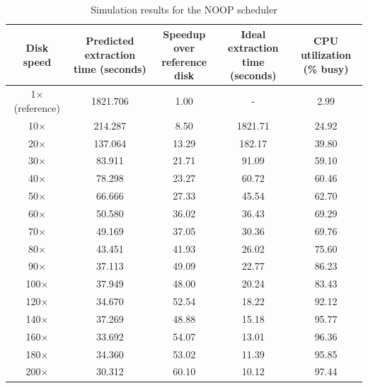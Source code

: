 \begin{table}[htbp]%
	\small
	\centering
	\caption{Simulation results for the NOOP scheduler}\label{tab:ch5-NOOP-scheduler}
	\noindent\begin{tabular}{cSSSS}
		\toprule
		\parbox{2cm}{\centering Disk speed} & \parbox{3.5cm}{\centering Predicted extraction \\ time (seconds)} & \parbox{2.5cm}{\centering Speedup over \\ reference disk} & \parbox{3cm}{\centering Ideal extraction \\ time (seconds)} & \parbox{2.5cm}{\centering CPU utilization \\ (\% busy)} \\
		\midrule
		
		1$\times$ (reference) & 1821.706 & 1.00 &  & 2.99 \\
		10$\times$ & 214.287 & 8.50 & 1821.71 & 24.92 \\
		20$\times$ & 137.064 & 13.29 & 182.17 & 39.80 \\
		30$\times$ & 83.911 & 21.71 & 91.09 & 59.10 \\
		40$\times$ & 78.298 & 23.27 & 60.72 & 60.46 \\
		50$\times$ & 66.666 & 27.33 & 45.54 & 62.70 \\
		60$\times$ & 50.580 & 36.02 & 36.43 & 69.29 \\
		70$\times$ & 49.169 & 37.05 & 30.36 & 69.76 \\
		80$\times$ & 43.451 & 41.93 & 26.02 & 75.60 \\
		90$\times$ & 37.113 & 49.09 & 22.77 & 86.23 \\
		100$\times$ & 37.949 & 48.00 & 20.24 & 83.43 \\
		120$\times$ & 34.670 & 52.54 & 18.22 & 92.12 \\
		140$\times$ & 37.269 & 48.88 & 15.18 & 95.77 \\
		160$\times$ & 33.692 & 54.07 & 13.01 & 96.36 \\
		180$\times$ & 34.360 & 53.02 & 11.39 & 95.85 \\
		200$\times$ & 30.312 & 60.10 & 10.12 & 97.44 \\
		
		\bottomrule
	\end{tabular}
\end{table}%

